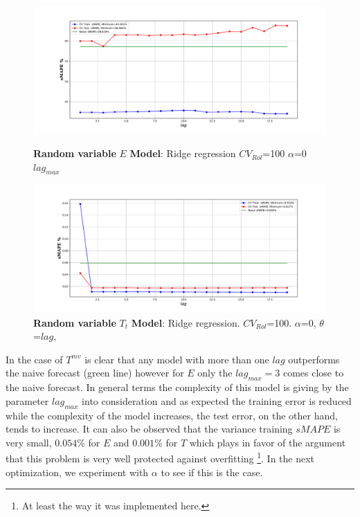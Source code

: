 \begin{figure}[h!]
	\centering
	
	\begin{minipage}[b]{\textwidth}
		\includegraphics[width=\textwidth]{data/error_sc_1_lag.pdf}
		\caption{\textbf{Random variable} $E$ \textbf{Model}: Ridge regression \textbf{$CV_{Rol}$}=100 \textbf{$\alpha$}=0 $lag_{max}$ }
		\label{fig:error_sc_1_lag}
	\end{minipage}
	
	\hfill
	\begin{minipage}[b]{\textwidth}
		\includegraphics[width=\textwidth]{data/trend_sc_1_lag.pdf}
		\caption{\textbf{Random variable} $T_{t}$ \textbf{Model}: Ridge regression. \textbf{$CV_{Rol}$}=100. $\alpha$=0, $\theta$=$lag$, } %
		\label{fig:trend_sc_1_lag}
	\end{minipage}
	
\end{figure}


In the case of $T^{mv}$ is clear that any model with more than one $lag$ outperforms the naive forecast (green line) however for $E$ only the $lag_{max}=3$ comes close to the naive forecast. In general terms the complexity of this model is giving by the parameter $lag_{max}$ into consideration and as expected the training error is reduced while the complexity of the model increases, the test error, on the other hand, tends to increase. It can also be observed that the variance training $sMAPE$ is very small, $0.054\%$ for $E$ and $0.001\%$ for $T$ which plays in favor of the argument that this problem is very well protected against overfitting \footnote{At least the way it was implemented here.}. In the next optimization, we experiment with $\alpha$ to see if this is the case. \\

